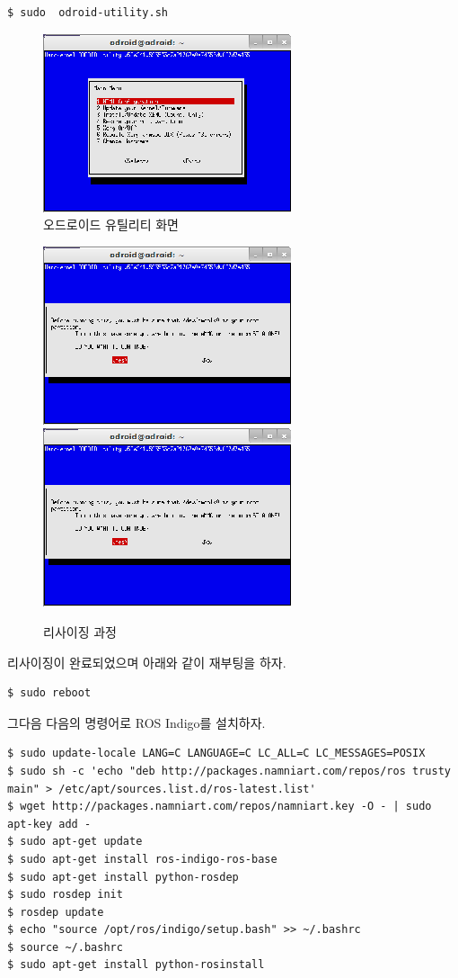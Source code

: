 \begin{lstlisting}[language=ROS]
$ sudo  odroid-utility.sh 
\end{lstlisting}

\begin{figure}[h]
\centering\includegraphics[width=0.5\columnwidth]{pictures/chapter3/odroid_option1.png}
\caption{오드로이드 유틸리티 화면}
\label{fig:odroid_utility}
\end{figure}

\begin{figure}[h]
\centering
\includegraphics[width=0.4\columnwidth]{pictures/chapter3/odroid_option2.png}
\includegraphics[width=0.4\columnwidth]{pictures/chapter3/odroid_option3.png}
\caption{리사이징 과정}
\end{figure}

\newpage

리사이징이 완료되었으며 아래와 같이 재부팅을 하자.

\begin{lstlisting}[language=ROS]
$ sudo reboot 
\end{lstlisting}

그다음 다음의 명령어로 ROS Indigo를 설치하자.

\begin{lstlisting}[language=ROS]
$ sudo update-locale LANG=C LANGUAGE=C LC_ALL=C LC_MESSAGES=POSIX
$ sudo sh -c 'echo "deb http://packages.namniart.com/repos/ros trusty main" > /etc/apt/sources.list.d/ros-latest.list'
$ wget http://packages.namniart.com/repos/namniart.key -O - | sudo apt-key add -
$ sudo apt-get update
$ sudo apt-get install ros-indigo-ros-base
$ sudo apt-get install python-rosdep
$ sudo rosdep init
$ rosdep update
$ echo "source /opt/ros/indigo/setup.bash" >> ~/.bashrc
$ source ~/.bashrc
$ sudo apt-get install python-rosinstall
\end{lstlisting}

